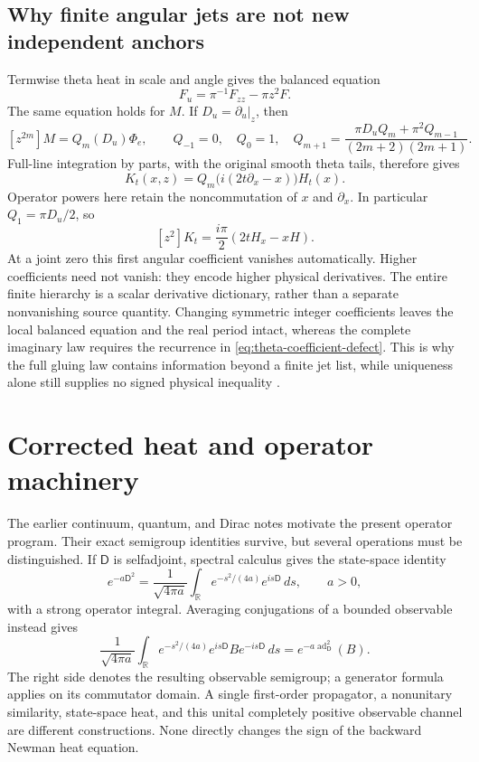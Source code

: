 \documentclass[11pt]{article}
\numberwithin{equation}{section}
\theoremstyle{definition}
\theoremstyle{remark}
\begin{document}
\subsection{Why finite angular jets are not new independent anchors}
\label{sec:theta-angular-dictionary}

Termwise theta heat in scale and angle gives the balanced equation
\[
 F_u=\pi^{-1}F_{zz}-\pi z^2F.
\]
The same equation holds for $M$.  If $D_u=\partial_u|_z$, then
\[
 [z^{2m}]M=Q_m(D_u)\Phi_e,
 \qquad
 Q_{-1}=0,\quad Q_0=1,\quad
 Q_{m+1}=\frac{\pi D_uQ_m+\pi^2Q_{m-1}}{(2m+2)(2m+1)}.
\]
Full-line integration by parts, with the original smooth theta tails,
therefore gives
\begin{equation}
 [z^{2m}]K_t(x,z)=Q_m\bigl(i(2t\partial_x-x)\bigr)H_t(x).
 \label{eq:theta-angular-dictionary}
\end{equation}
Operator powers here retain the noncommutation of $x$ and
$\partial_x$.  In particular $Q_1=\pi D_u/2$, so
\[
 [z^2]K_t=\frac{i\pi}{2}(2tH_x-xH).
\]
At a joint zero this first angular coefficient vanishes automatically.
Higher coefficients need not vanish: they encode higher physical
derivatives.  The entire finite hierarchy is a scalar derivative
dictionary, rather than a separate nonvanishing source quantity.
Changing symmetric integer coefficients leaves the local balanced
equation and the real period intact, whereas the complete imaginary
law requires the recurrence in
\eqref{eq:theta-coefficient-defect}.  This is why the full gluing law
contains information beyond a finite jet list, while uniqueness alone
still supplies no signed physical inequality \cite{ellipticnote}.


\section{Corrected heat and operator machinery}
\label{sec:corrected-heat}

The earlier continuum, quantum, and Dirac notes
\cite{baker2017,baker2018heat,baker2018dirac} motivate the present
operator program.  Their exact semigroup identities survive, but several
operations must be distinguished.  If $\mathsf D$ is selfadjoint, spectral
calculus gives the state-space identity
\begin{equation}\label{eq:dirac-gaussian-average}
 e^{-a\mathsf D^2}
 =\frac1{\sqrt{4\pi a}}\int_{\mathbb R}
       e^{-s^2/(4a)}e^{is\mathsf D}\,ds,\qquad a>0,
\end{equation}
with a strong operator integral.  Averaging conjugations of a bounded
observable instead gives
\begin{equation}\label{eq:observable-dirac-average}
 \frac1{\sqrt{4\pi a}}\int_{\mathbb R}e^{-s^2/(4a)}
 e^{is\mathsf D}Be^{-is\mathsf D}\,ds
 =e^{-a\operatorname{ad}_{\mathsf D}^2}(B).
\end{equation}
The right side denotes the resulting observable semigroup; a generator
formula applies on its commutator domain.  A single first-order
propagator, a nonunitary similarity, state-space heat, and this unital
completely positive observable channel are different constructions.
None directly changes the sign of the backward Newman heat equation.
\end{document}
